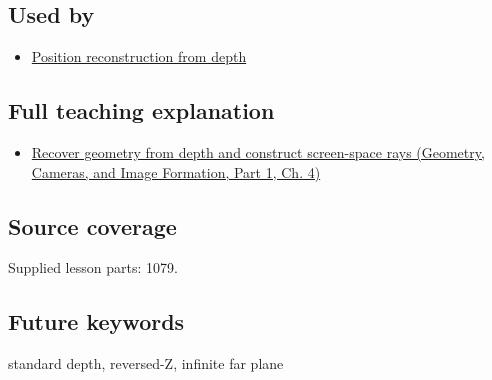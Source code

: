 \subsection{Used by}\label{appendix-1bc40b08db4a-used-by}

\hypertarget{appendix-1bc40b08db4a-used-by}{}

\begin{itemize}
\tightlist
\item
  \hyperref[appendix-2cbf2968e866]{Position reconstruction from depth}
\end{itemize}

\subsection{Full teaching explanation}\label{appendix-1bc40b08db4a-full-teaching-explanation}

\hypertarget{appendix-1bc40b08db4a-full-teaching-explanation}{}

\begin{itemize}
\tightlist
\item
  \href{../03-Geometry-Cameras-and-Image-Formation-P01/main.pdf\#02-foundations-ii-ch035-recover-geometry-from-depth-and-construct-screen-space-rays}{Recover geometry from depth and construct screen-space rays (Geometry, Cameras, and Image Formation, Part 1, Ch. 4)}
\end{itemize}

\subsection{Source coverage}\label{appendix-1bc40b08db4a-source-coverage}

\hypertarget{appendix-1bc40b08db4a-source-coverage}{}

Supplied lesson parts: 1079.

\subsection{Future keywords}\label{appendix-1bc40b08db4a-future-keywords}

\hypertarget{appendix-1bc40b08db4a-future-keywords}{}

standard depth, reversed-Z, infinite far plane
